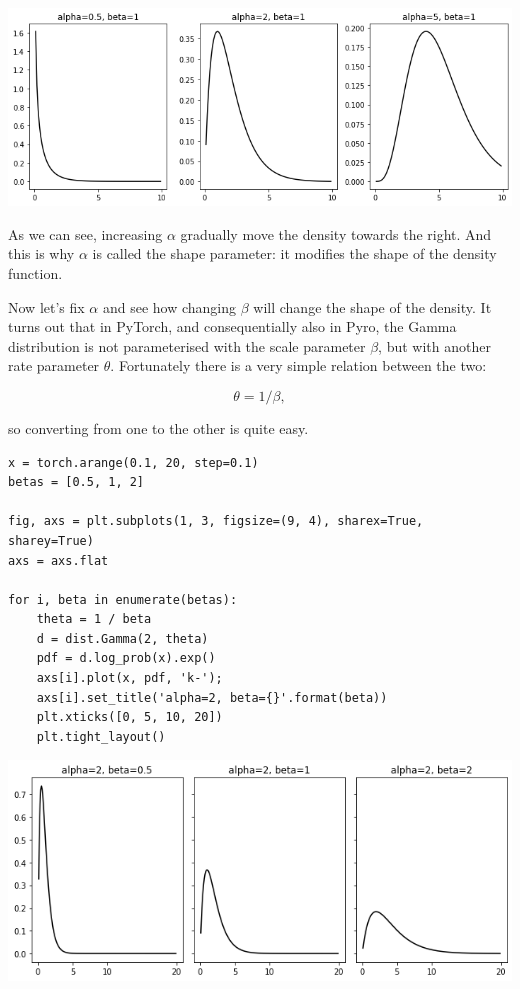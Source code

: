 \documentclass[11pt]{article}
\begin{document}
\begin{center}
\includegraphics[width=.9\linewidth]{./.ob-jupyter/80083ecd858be97cb520fd66d7b81b26fd431aee.png}
\end{center}

As we can see, increasing \(\alpha\) gradually move the density towards the right. And this is why \(\alpha\) is called the shape parameter: it modifies the shape of the density function.

Now let's fix \(\alpha\) and see how changing \(\beta\) will change the shape of the density. It turns out that in PyTorch, and consequentially also in Pyro, the Gamma distribution is not parameterised with the scale parameter \(\beta\), but with another rate parameter \(\theta\). Fortunately there is a very simple relation between the two:

$$ \theta= 1 / \beta,$$

so converting from one to the other is quite easy.

\begin{verbatim}
x = torch.arange(0.1, 20, step=0.1)
betas = [0.5, 1, 2]

fig, axs = plt.subplots(1, 3, figsize=(9, 4), sharex=True, sharey=True)
axs = axs.flat

for i, beta in enumerate(betas):
    theta = 1 / beta
    d = dist.Gamma(2, theta)
    pdf = d.log_prob(x).exp()
    axs[i].plot(x, pdf, 'k-');
    axs[i].set_title('alpha=2, beta={}'.format(beta))
    plt.xticks([0, 5, 10, 20])
    plt.tight_layout()
\end{verbatim}

\begin{center}
\includegraphics[width=.9\linewidth]{./.ob-jupyter/da4dfaf42c9ea90d5ed51f8892681df9f5722dde.png}
\end{center}
\end{document}
